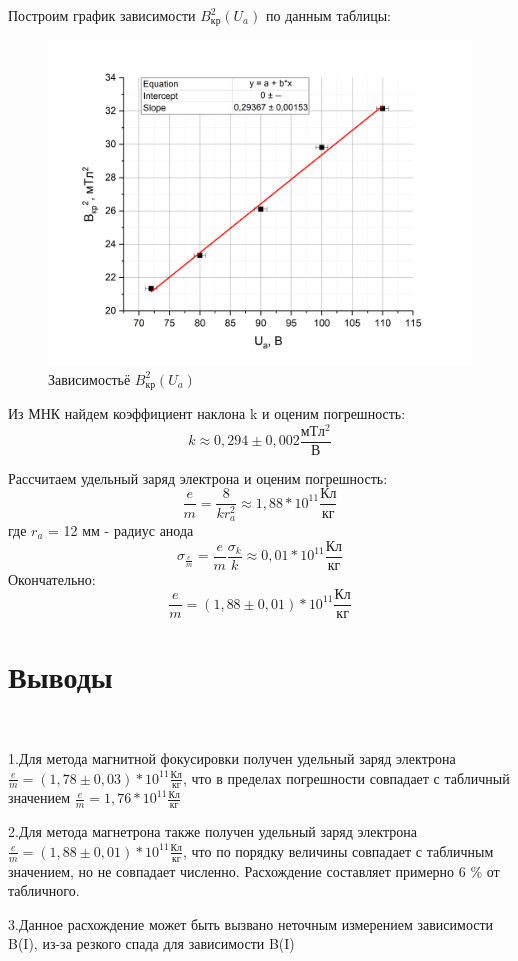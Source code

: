 \documentclass[a4paper,12pt]{article}
\begin{document}
Построим график зависимости $B_{кр}^2(U_a)$ по данным таблицы:

\begin{figure}[h!]
	\begin{center}
	\includegraphics[scale=0.5]{graph9}
	\end{center}
	\caption{Зависимостьё	 $B_{кр}^2(U_a)$}
	\end{figure}

Из МНК найдем коэффициент наклона k и оценим погрешность:
$$
	k \approx 0,294 \pm 0,002 \frac{мТл^2}{В}
$$

Рассчитаем удельный заряд электрона и оценим погрешность:
$$
	\frac{e}{m} = \frac{8}{k  r_a^2} \approx 1,88*10^{11} \frac{Кл}{кг}
$$
где $r_a$ = 12 мм - радиус анода
$$
	\sigma_{\frac{e}{m}} = \frac{e}{m} \frac{\sigma_k}{k} \approx 0,01*10^{11}  \frac{Кл}{кг}
$$
Окончательно:
$$
\frac{e}{m} = (1,88 \pm 0,01)*10^{11}  \frac{Кл}{кг}
$$

\newpage

\section*{Выводы}
\

1.Для метода магнитной фокусировки получен удельный заряд электрона$\frac{e}{m} = (1,78 \pm 0,03)*10^{11}\frac{Кл}{кг}$, что в пределах погрешности совпадает с табличный значением $\frac{e}{m} = 1,76*10^{11}\frac{Кл}{кг}$

2.Для метода магнетрона также получен удельный заряд электрона $\frac{e}{m} = (1,88 \pm 0,01)*10^{11}  \frac{Кл}{кг}$, что по порядку величины совпадает с табличным значением, но не совпадает численно. Расхождение составляет примерно 6 \% от табличного.

3.Данное расхождение может быть вызвано неточным измерением зависимости B(I), из-за резкого спада для зависимости B(I)	

	
	
\end{document}
